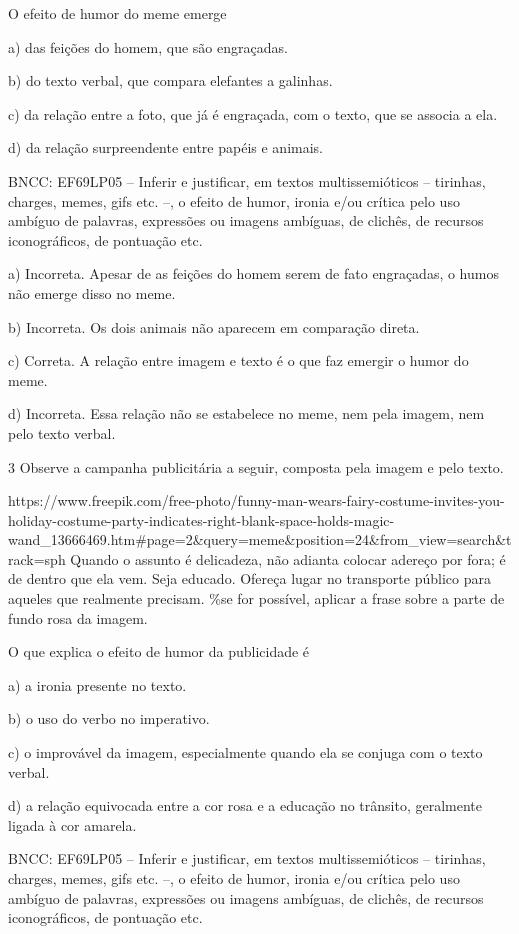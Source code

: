 {O efeito de humor do meme emerge

a) das feições do homem, que são engraçadas.

b) do texto verbal, que compara elefantes a galinhas.

c) da relação entre a foto, que já é engraçada, com o texto, que se
associa a ela.

d) da relação surpreendente entre papéis e animais.

BNCC: EF69LP05 -- Inferir e justificar, em textos multissemióticos --
tirinhas, charges, memes, gifs etc. --, o efeito de humor, ironia e/ou
crítica pelo uso ambíguo de palavras, expressões ou imagens ambíguas, de
clichês, de recursos iconográficos, de pontuação etc.

a) Incorreta. Apesar de as feições do homem serem de fato engraçadas, o
humos não emerge disso no meme.

b) Incorreta. Os dois animais não aparecem em comparação direta.

c) Correta. A relação entre imagem e texto é o que faz emergir o humor
do meme.

d) Incorreta. Essa relação não se estabelece no meme, nem pela imagem,
nem pelo texto verbal.

\num{3} Observe a campanha publicitária a seguir, composta pela imagem e
pelo texto.

https://www.freepik.com/free-photo/funny-man-wears-fairy-costume-invites-you-holiday-costume-party-indicates-right-blank-space-holds-magic-wand\_13666469.htm\#page=2\&query=meme\&position=24\&from\_view=search\&track=sph
Quando o assunto é delicadeza, não adianta colocar adereço por fora; é
de dentro que ela vem. Seja educado. Ofereça lugar no transporte público
para aqueles que realmente precisam. \%se for possível, aplicar a frase
sobre a parte de fundo rosa da imagem.

O que explica o efeito de humor da publicidade é

a) a ironia presente no texto.

b) o uso do verbo no imperativo.

c) o improvável da imagem, especialmente quando ela se conjuga com o
texto verbal.

d) a relação equivocada entre a cor rosa e a educação no trânsito,
geralmente ligada à cor amarela.

BNCC: EF69LP05 -- Inferir e justificar, em textos multissemióticos --
tirinhas, charges, memes, gifs etc. --, o efeito de humor, ironia e/ou
crítica pelo uso ambíguo de palavras, expressões ou imagens ambíguas, de
clichês, de recursos iconográficos, de pontuação etc.

}
